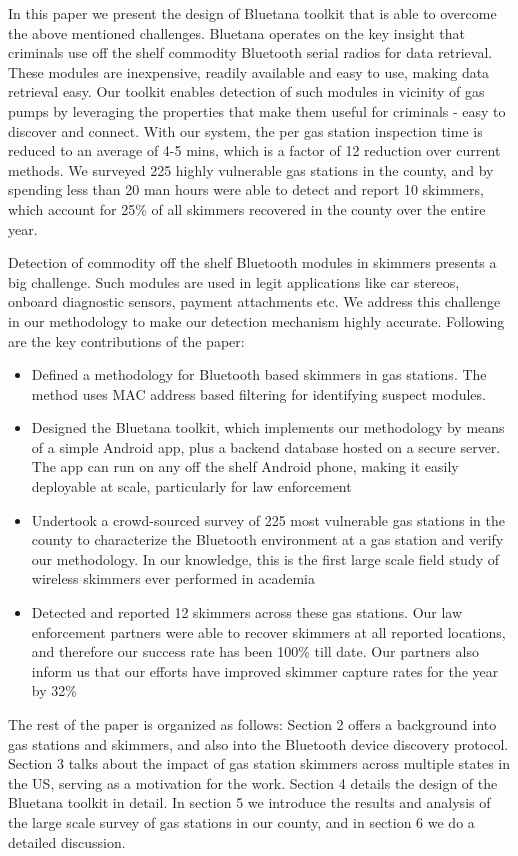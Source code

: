 In this paper we present the design of Bluetana toolkit that is able to overcome the above mentioned challenges. Bluetana operates on the key insight that criminals use off the shelf commodity Bluetooth serial radios for data retrieval. These modules are inexpensive, readily available and easy to use, making data retrieval easy. Our toolkit enables detection of such modules in vicinity of gas pumps by leveraging the properties that make them useful for criminals - easy to discover and connect. With our system, the per gas station inspection time is reduced to an average of 4-5 mins, which is a factor of 12 reduction over current methods. We surveyed 225 highly vulnerable gas stations in the county, and by spending less than 20 man hours were able to detect and report 10 skimmers, which account for 25\% of all skimmers recovered in the county over the entire year.

Detection of commodity off the shelf Bluetooth modules in skimmers presents a big challenge. Such modules are used in legit applications like car stereos, onboard diagnostic sensors, payment attachments etc. We address this challenge in our methodology to make our detection mechanism highly accurate. Following are the key contributions of the paper:
\begin{itemize}
	\item Defined a methodology for Bluetooth based skimmers in gas stations. The method uses MAC address based filtering for identifying suspect modules.
	\item Designed the Bluetana toolkit, which implements our methodology by means of a simple Android app, plus a backend database hosted on a secure server. The app can run on any off the shelf Android phone, making it easily deployable at scale, particularly for law enforcement
	\item Undertook a crowd-sourced survey of 225 most vulnerable gas stations in the county to characterize the Bluetooth environment at a gas station and verify our methodology. In our knowledge, this is the first large scale field study of wireless skimmers ever performed in academia
	\item Detected and reported 12 skimmers across these gas stations. Our law enforcement partners were able to recover skimmers at all reported locations, and therefore our success rate has been 100\% till date. Our partners also inform us that our efforts have improved skimmer capture rates for the year by 32\%
\end{itemize}
The rest of the paper is organized as follows: Section 2 offers a background into gas stations and skimmers, and also into the Bluetooth device discovery protocol. Section 3 talks about the impact of gas station skimmers across multiple states in the US, serving as a motivation for the work. Section 4 details the design of the Bluetana toolkit in detail. In section 5 we introduce the results and analysis of the large scale survey of gas stations in our county, and in section 6 we do a detailed discussion.


